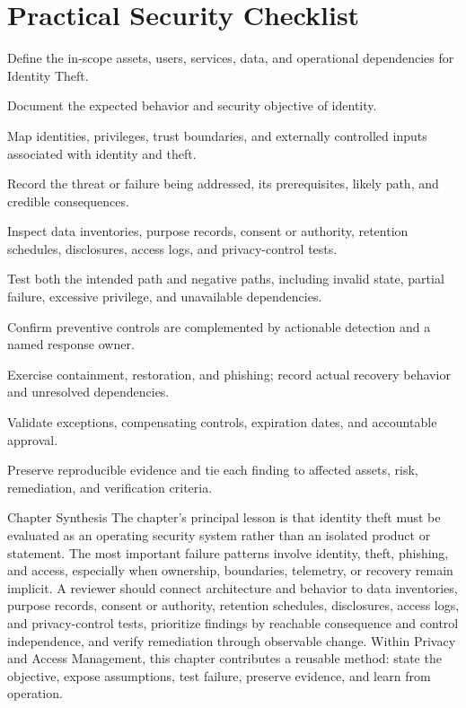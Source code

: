 \documentclass[11pt,letterpaper]{article}
\begin{document}
\section*{Practical Security Checklist}
\begin{CornellChecklist}
\item Define the in-scope assets, users, services, data, and operational dependencies for Identity Theft.
\item Document the expected behavior and security objective of identity.
\item Map identities, privileges, trust boundaries, and externally controlled inputs associated with identity and theft.
\item Record the threat or failure being addressed, its prerequisites, likely path, and credible consequences.
\item Inspect data inventories, purpose records, consent or authority, retention schedules, disclosures, access logs, and privacy-control tests.
\item Test both the intended path and negative paths, including invalid state, partial failure, excessive privilege, and unavailable dependencies.
\item Confirm preventive controls are complemented by actionable detection and a named response owner.
\item Exercise containment, restoration, and phishing; record actual recovery behavior and unresolved dependencies.
\item Validate exceptions, compensating controls, expiration dates, and accountable approval.
\item Preserve reproducible evidence and tie each finding to affected assets, risk, remediation, and verification criteria.
\end{CornellChecklist}
\begin{CornellSummaryBox}{Chapter Synthesis}
The chapter's principal lesson is that identity theft must be evaluated as an operating security system rather than an isolated product or statement. The most important failure patterns involve identity, theft, phishing, and access, especially when ownership, boundaries, telemetry, or recovery remain implicit. A reviewer should connect architecture and behavior to data inventories, purpose records, consent or authority, retention schedules, disclosures, access logs, and privacy-control tests, prioritize findings by reachable consequence and control independence, and verify remediation through observable change. Within Privacy and Access Management, this chapter contributes a reusable method: state the objective, expose assumptions, test failure, preserve evidence, and learn from operation.
\end{CornellSummaryBox}
\end{document}
